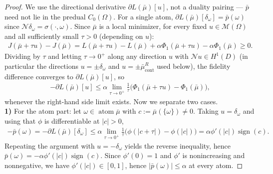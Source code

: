 \documentclass[11pt]{amsart}
\theoremstyle{definition}
\theoremstyle{remark}
\DeclareMathOperator{\atom}{atom}
\DeclareMathOperator{\cont}{cont}
\DeclareMathOperator{\sign}{sign}
\begin{document}
\begin{proof}
We use the directional derivative $\partial L(\bar{\mu})[u]$, not a duality pairing --- $\bar{p}$ need not lie in the predual $C_0(\Omega)$. For a single atom, $\partial L(\bar{\mu})[\delta_\omega] = \bar{p}(\omega)$ since $\mathcal{N}\delta_\omega = \sigma(\cdot, \omega)$.
Since $\bar{\mu}$ is a local minimizer, for every fixed $u \in \mathcal{M}(\Omega)$ and all sufficiently small $\tau > 0$ (depending on $u$):
\begin{align*}
	J(\bar{\mu} + \tau u) - J(\bar{\mu}) = L(\bar{\mu} + \tau u) - L(\bar{\mu}) + \alpha \Phi_1(\bar{\mu} + \tau u) - \alpha \Phi_1(\bar{\mu}) \ge 0.
\end{align*}
Dividing by $\tau$ and letting $\tau \rightarrow 0^+$ along any direction $u$ with $\mathcal{N}u \in H^1(D)$ (in particular the directions $u = \pm\delta_\omega$ and $u = \pm\bar{\mu}_{\cont}^R$ used below), the fidelity difference converges to $\partial L(\bar{\mu})[u]$, so
\begin{align*}
	-\partial L(\bar{\mu})[u] \le \alpha \lim_{ \tau \rightarrow 0^+} \frac{1}{\tau} \big(\Phi_1(\bar{\mu} + \tau u) - \Phi_1(\bar{\mu}) \big),
\end{align*}
whenever the right-hand side limit exists.
Now we separate two cases.
\quad\\
\textbf{1)} For the atom part: let $\omega \in \atom \bar{\mu} $ with $c := \bar{\mu}(\{\omega\}) \neq 0$. Taking $u = \delta_\omega$ and using that $\phi$ is differentiable at $|c| > 0$,
\begin{align*}
	- \bar{p}(\omega) =  -\partial L(\bar{\mu})[\delta_\omega] \le \alpha \lim_{\tau \rightarrow 0^+} \frac{1}{\tau} \big(\phi (|c + \tau|) - \phi(|c|)\big) = \alpha \phi'(|c|) \sign(c).
\end{align*}
Repeating the argument with $u = - \delta_\omega$ yields the reverse inequality, hence $\bar{p}(\omega) = -\alpha \phi'(|c|) \sign(c)$.
Since $\phi'(0) = 1$ and $\phi'$ is nonincreasing and nonnegative, we have $\phi'(|c|) \in [0, 1]$, hence $|\bar{p}(\omega)| \le \alpha$ at every atom.


\end{proof}
\end{document}

